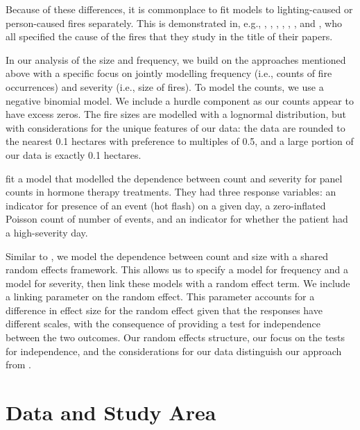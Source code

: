 \documentclass[10pt,letterpaper]{article}
\begin{document}
Because of these differences, it is commonplace to fit models to
lighting-caused or person-caused fires separately. This is
demonstrated in, e.g., \cite{cunninghamStochasticModelOccurence},
\cite{martellLogisticModelPredicting},
\cite{podurSpatialPatternsLightningcaused2003},
\cite{wottonLightningFireOccurrence2005},
\cite{kayAreLightningFires2007},
\cite{wottonLightningFirePrediction2012}, and
\cite{plucinskiPredictingNumberDaily2014}, who all specified the cause
of the fires that they study in the title of their papers.

In our analysis of the size and frequency, we build on the approaches
mentioned above with a specific focus on jointly modelling frequency (i.e., counts of fire occurrences) and severity (i.e., size of fires). To model the counts, we use a negative binomial model.
We include a hurdle component as our counts appear to have excess zeros.
The fire sizes are modelled with a lognormal distribution, but with
considerations for the unique features of our data: the
data are rounded to the nearest 0.1 hectares with preference to
multiples of 0.5, and a large portion of our data is exactly 0.1
hectares.

\cite{juarez-colungaJointModelingZeroinflated2017} fit a model that modelled the dependence between count and severity for panel counts in hormone therapy treatments. They had three response variables: an indicator for presence of an event (hot flash) on a given day, a zero-inflated Poisson count of number of events, and an indicator for whether the patient had a high-severity day.

Similar to \cite{juarez-colungaJointModelingZeroinflated2017}, we model the dependence between count and size with a shared random
effects framework. This allows us to specify a model for frequency and a model for severity, then link these models with a random effect term. We include a linking parameter on the random
effect. This parameter accounts for a difference in effect size for the
random effect given that the responses have different scales, with the
consequence of providing a test for independence between the two
outcomes. Our random effects structure, our focus on the tests for independence, and the considerations for our data distinguish our approach from \cite{juarez-colungaJointModelingZeroinflated2017}.


\section{Data and Study Area}\label{data-and-study-area}
\end{document}
